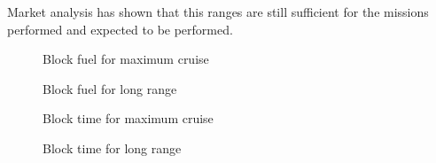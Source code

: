Market analysis has shown that this ranges are still sufficient for the missions performed and expected to be performed.

\begin{figure}[H] %
\caption{Block fuel for maximum cruise}
\label{fig:fig10_block_fuel_max}
\end{figure}

\begin{figure}[H] %
\caption{Block fuel for long range}
\label{fig:fig11_block_fuel_long}
\end{figure}

\begin{figure}[H] %
\caption{Block time for maximum cruise}
\label{fig:fig12_block_time_max}
\end{figure}

\begin{figure}[H] %
\caption{Block time for long range}
\label{fig:fig13_block_time_long}
\end{figure}

